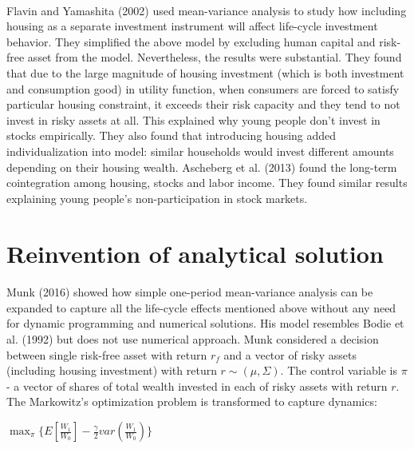 \paragraph*{}Flavin and Yamashita (2002) used mean-variance analysis to study how including housing as a separate investment instrument will affect life-cycle investment behavior. They simplified the above model by excluding human capital and risk-free asset from the model. Nevertheless, the results were substantial. They found that due to the large magnitude of housing investment (which is both investment and consumption good) in utility function, when consumers are forced to satisfy particular housing constraint, it exceeds their risk capacity and they tend to not invest in risky assets at all. This explained why young people don't invest in stocks empirically. They also found that introducing housing added individualization into model: similar households would invest different amounts depending on their housing wealth. Ascheberg et al. (2013) found the long-term cointegration among housing, stocks and labor income. They found similar results explaining young people's non-participation in stock markets. 



\section{Reinvention of analytical solution}


\paragraph*{}Munk (2016) showed how simple one-period mean-variance analysis can be expanded to capture all the life-cycle effects mentioned above without any need for dynamic programming and numerical solutions. His model resembles Bodie et al. (1992) but does not use numerical approach. Munk considered a decision between single risk-free asset with return $r_f$ and a vector of risky assets (including housing investment) with return $r \sim (\mu, \Sigma)$. The control variable is $\pi$ - a vector of shares of total wealth invested in each of risky assets with return $r$. The Markowitz's optimization problem is transformed to capture dynamics:


\begin{center}
	$ \displaystyle\max_{\pi} \{ E[\frac{W_1}{W_0}] - \frac{\gamma}{2} var(\frac{W_1}{W_0}) \} $
\end{center}

